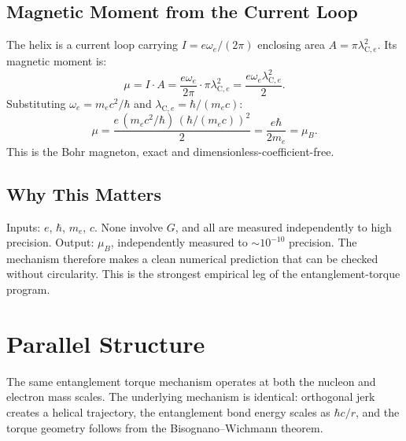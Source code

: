 \documentclass[11pt,letterpaper]{article}
\newcommand{\lambdace}{\lambda_{\mathrm{C},e}}
\begin{document}
\subsection{Magnetic Moment from the Current Loop}

The helix is a current loop carrying $I = e\omega_e/(2\pi)$ enclosing
area $A = \pi \lambdace^2$. Its magnetic moment is:
\begin{equation}
  \mu = I \cdot A
      = \frac{e\omega_e}{2\pi} \cdot \pi \lambdace^2
      = \frac{e \omega_e \lambdace^2}{2}.
\end{equation}
Substituting $\omega_e = m_e c^2/\hbar$ and $\lambdace = \hbar/(m_e c)$:
\begin{equation}
  \mu = \frac{e\,(m_e c^2/\hbar)\,(\hbar/(m_e c))^2}{2}
      = \frac{e\hbar}{2 m_e}
      = \mu_B.
\end{equation}
This is the Bohr magneton, exact and dimensionless-coefficient-free.

\subsection{Why This Matters}

Inputs: $e$, $\hbar$, $m_e$, $c$. None involve $G$, and all are
measured independently to high precision. Output: $\mu_B$,
independently measured to $\sim 10^{-10}$ precision. The mechanism
therefore makes a clean numerical prediction that can be checked
without circularity. This is the strongest empirical leg of the
entanglement-torque program.

\section{Parallel Structure}

The same entanglement torque mechanism operates at both the nucleon and electron
mass scales. The underlying mechanism is identical: orthogonal jerk creates a
helical trajectory, the entanglement bond energy scales as $\hbar c/r$, and the
torque geometry follows from the Bisognano--Wichmann theorem.
\end{document}
